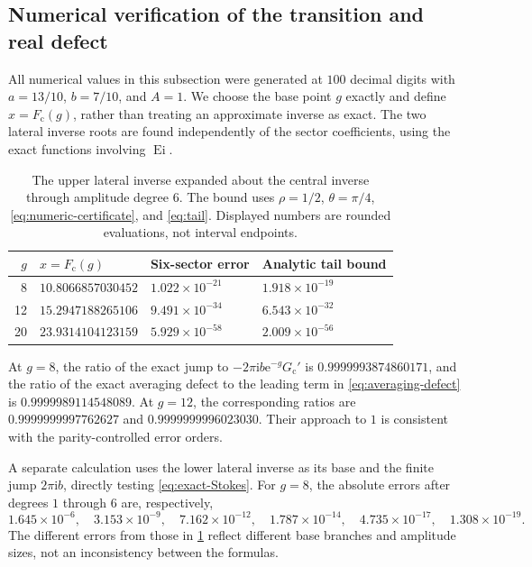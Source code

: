 \documentclass[11pt,a4paper]{article}
\numberwithin{equation}{section}
\theoremstyle{definition}
\theoremstyle{remark}
\newcommand{\e}{\mathrm e}
\newcommand{\ii}{\mathrm i}
\newcommand{\cF}{F_{\mathrm c}}
\newcommand{\cG}{G_{\mathrm c}}
\DeclareMathOperator{\Ei}{Ei}
\begin{document}
\subsection{Numerical verification of the transition and real defect}
All numerical values in this subsection were generated at $100$ decimal digits with $a=13/10$, $b=7/10$, and $A=1$. We choose the base point $g$ exactly and define $x=\cF(g)$, rather than treating an approximate inverse as exact. The two lateral inverse roots are found independently of the sector coefficients, using the exact functions involving $\Ei$.

\begin{table}[H]
\centering
\small
\begin{tabular}{@{}rlll@{}}
\toprule
$g$ & $x=\cF(g)$ & Six-sector error & Analytic tail bound\\
\midrule
8 & $10.8066857030452$ & $1.022\times10^{-21}$ & $1.918\times10^{-19}$\\
12 & $15.2947188265106$ & $9.491\times10^{-34}$ & $6.543\times10^{-32}$\\
20 & $23.9314104123159$ & $5.929\times10^{-58}$ & $2.009\times10^{-56}$\\
\bottomrule
\end{tabular}
\caption{The upper lateral inverse expanded about the central inverse through amplitude degree $6$. The bound uses $\rho=1/2$, $\theta=\pi/4$, \eqref{eq:numeric-certificate}, and \eqref{eq:tail}. Displayed numbers are rounded evaluations, not interval endpoints.}
\label{tab:tail}
\end{table}

At $g=8$, the ratio of the exact jump to $-2\pi\ii b\e^{-g}\cG'$ is
$0.9999993874860171$, and the ratio of the exact averaging defect to the leading term in \eqref{eq:averaging-defect} is $0.9999989114548089$. At $g=12$, the corresponding ratios are $0.9999999997762627$ and $0.9999999996023030$. Their approach to $1$ is consistent with the parity-controlled error orders.

A separate calculation uses the lower lateral inverse as its base and the finite jump $2\pi\ii b$, directly testing \eqref{eq:exact-Stokes}. For $g=8$, the absolute errors after degrees $1$ through $6$ are, respectively,
\[
 1.645\times10^{-6},\quad3.153\times10^{-9},\quad
 7.162\times10^{-12},\quad1.787\times10^{-14},\quad
 4.735\times10^{-17},\quad1.308\times10^{-19}.
\]
The different errors from those in \cref{tab:tail} reflect different base branches and amplitude sizes, not an inconsistency between the formulas.
\end{document}

